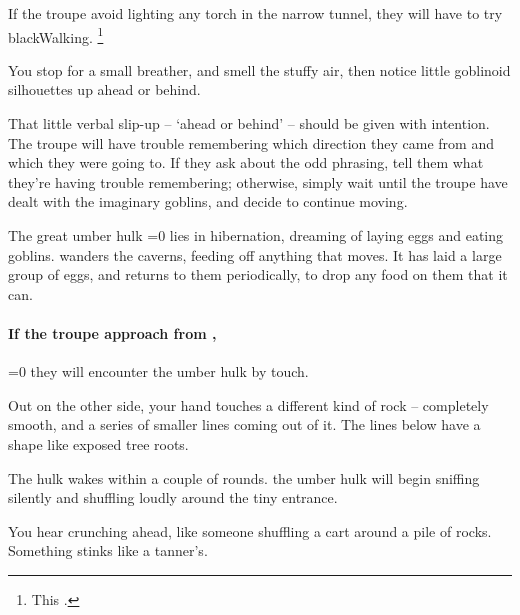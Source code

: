 \begin{multicols}{2}
If the troupe avoid lighting any torch in the narrow tunnel, they will have to try \gls{blackWalking}.%
\footnote{This .}

\begin{boxtext}
  You stop for a small breather, and smell the stuffy air, then notice little goblinoid silhouettes up ahead or behind.
\end{boxtext}

That little verbal slip-up -- `ahead or behind' -- should be given with intention.
The troupe will have trouble remembering which direction they came from and which they were going to.
If they ask about the odd phrasing, tell them what they're having trouble remembering; otherwise, simply wait until the troupe have dealt with the imaginary goblins, and decide to continue moving.



\begin{exampletext}
  The great umber hulk%
  \ifnum\value{temperature}=0
    lies in hibernation, dreaming of laying eggs and eating goblins.
  \else
    wanders the caverns, feeding off anything that moves.
    It has laid a large group of eggs, and returns to them periodically, to drop any food on them that it can.
  \fi
\end{exampletext}

\paragraph{If the troupe approach from ,}
\ifnum\value{temperature}=0
  they will encounter the umber hulk by touch.

  \begin{boxtext}
    Out on the other side, your hand touches a different kind of rock -- completely smooth, and a series of smaller lines coming out of it.
    The lines below have a shape like exposed tree roots.
  \end{boxtext}

  The hulk wakes within a couple of \glspl{round}.
\else
  the umber hulk will begin sniffing silently and shuffling loudly around the tiny entrance.

  \begin{boxtext}
    You hear crunching ahead, like someone shuffling a cart around a pile of rocks.
    Something stinks like a tanner's.
  \end{boxtext}
\fi


\end{multicols}
